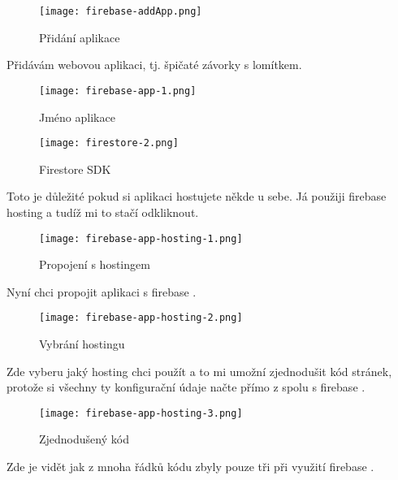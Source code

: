 \begin{figure}[H]
    \centering
    \texttt{[image: firebase-addApp.png]}
    \caption{Přidání aplikace}
\end{figure}
Přidávám webovou aplikaci, tj. špičaté závorky s lomítkem.
\begin{figure}[H]
    \centering
    \texttt{[image: firebase-app-1.png]}
    \caption{Jméno aplikace}
\end{figure}
\begin{figure}[H]
    \centering
    \texttt{[image: firestore-2.png]}
    \caption{Firestore SDK}
\end{figure}
Toto je důležité pokud si aplikaci hostujete někde u sebe. Já použiji \gls{firebase} \gls{hosting} a tudíž mi to stačí 
odkliknout.
\begin{figure}[H]
    \centering
    \texttt{[image: firebase-app-hosting-1.png]}
    \caption{Propojení s hostingem}
\end{figure}
Nyní chci propojit aplikaci s firebase .
\begin{figure}[H]
    \centering
    \texttt{[image: firebase-app-hosting-2.png]}
    \caption{Vybrání hostingu}
\end{figure}
Zde vyberu jaký \gls{hosting} chci použít a to mi umožní zjednodušit kód stránek, protože si všechny ty konfigurační 
údaje načte přímo z  spolu s \gls{firebase} .
\begin{figure}[H]
    \centering
    \texttt{[image: firebase-app-hosting-3.png]}
    \caption{Zjednodušený kód}
\end{figure}
Zde je vidět jak z mnoha řádků kódu zbyly pouze tři při využití \gls{firebase} .
